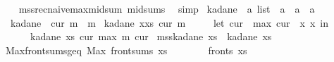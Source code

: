 \begin{isabellebody}
%
\isadelimproof
\ \ %
\endisadelimproof
%
\isatagproof
{}\isamarkupfalse%
\ mss{\isacharunderscore}{\kern0pt}rec{\isacharunderscore}{\kern0pt}naive{\isacharunderscore}{\kern0pt}max{\isacharunderscore}{\kern0pt}mid{\isacharunderscore}{\kern0pt}sum\ mid{\isacharunderscore}{\kern0pt}sums\ \isamarkupfalse%
\ simp%
\endisatagproof
{\isafoldproof}%
%
\isadelimproof
%
\endisadelimproof
%
\isadelimdocument
%
\endisadelimdocument
%
\isatagdocument
%
\isamarkuptrue%
%
\endisatagdocument
{\isafolddocument}%
%
\isadelimdocument
%
\endisadelimdocument
{}\isamarkupfalse%
\ kadane\ {\isacharcolon}{\kern0pt}{\isacharcolon}{\kern0pt}\ {\isachardoublequoteopen}{\isacharprime}{\kern0pt}a\ list\ {\isasymRightarrow}\ {\isacharprime}{\kern0pt}a\ {\isasymRightarrow}\ {\isacharprime}{\kern0pt}a\ {\isasymRightarrow}\ {\isacharprime}{\kern0pt}a{\isachardoublequoteclose}\ \isanewline
\ \ {\isachardoublequoteopen}kadane\ {\isacharbrackleft}{\kern0pt}{\isacharbrackright}{\kern0pt}\ cur\ m\ {\isacharequal}{\kern0pt}\ m{\isachardoublequoteclose}\isanewline
{\isacharbar}{\kern0pt}\ {\isachardoublequoteopen}kadane\ {\isacharparenleft}{\kern0pt}x{\isacharhash}{\kern0pt}xs{\isacharparenright}{\kern0pt}\ cur\ m\ {\isacharequal}{\kern0pt}\isanewline
\ \ \ \ {\isacharparenleft}{\kern0pt}let\ cur{\isacharprime}{\kern0pt}\ {\isacharequal}{\kern0pt}\ max\ {\isacharparenleft}{\kern0pt}cur\ {\isacharplus}{\kern0pt}\ x{\isacharparenright}{\kern0pt}\ x\ in\isanewline
\ \ \ \ \ \ kadane\ xs\ cur{\isacharprime}{\kern0pt}\ {\isacharparenleft}{\kern0pt}max\ m\ cur{\isacharprime}{\kern0pt}{\isacharparenright}{\kern0pt}{\isacharparenright}{\kern0pt}{\isachardoublequoteclose}\isanewline
\isanewline
{}\isamarkupfalse%
\ {\isachardoublequoteopen}mss{\isacharunderscore}{\kern0pt}kadane\ xs\ {\isasymequiv}\ kadane\ xs\ {}\ {}{\isachardoublequoteclose}\isanewline
\isanewline
{}\isamarkupfalse%
\ Max{\isacharunderscore}{\kern0pt}front{\isacharunderscore}{\kern0pt}sums{\isacharunderscore}{\kern0pt}geq{\isacharunderscore}{\kern0pt}{}{\isacharcolon}{\kern0pt}\ {\isachardoublequoteopen}Max\ {\isacharparenleft}{\kern0pt}front{\isacharunderscore}{\kern0pt}sums\ xs{\isacharparenright}{\kern0pt}\ {\isasymge}\ {}{\isachardoublequoteclose}\isanewline
%
\isadelimproof
%
\endisadelimproof
%
\isatagproof
{}\isamarkupfalse%
{\isacharminus}{\kern0pt}\isanewline
\ \ \isamarkupfalse%
\ {\isachardoublequoteopen}{\isacharbrackleft}{\kern0pt}{\isacharbrackright}{\kern0pt}\ {\isasymin}\ fronts\ xs{\isachardoublequoteclose}\ \isamarkupfalse%

\end{isabellebody}

